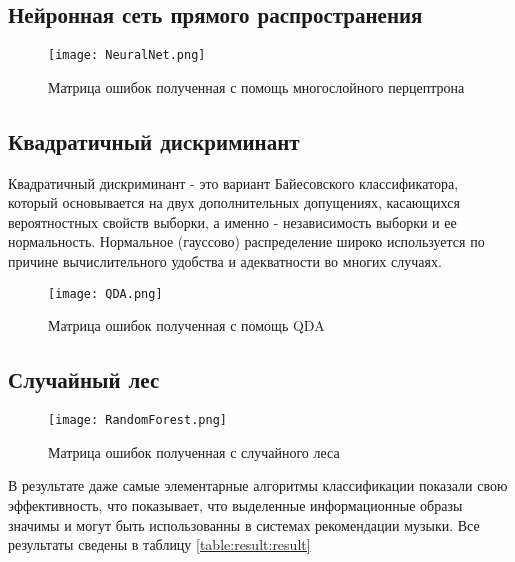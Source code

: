 \subsection{Нейронная сеть прямого распространения}

\begin{figure}[h]
\centering
  \texttt{[image: NeuralNet.png]}
  \caption{Матрица ошибок полученная с помощь многослойного перцептрона}
  \label{fig:results:NeuralNet}
\end{figure}


\subsection{Квадратичный дискриминант}


Квадратичный дискриминант - это вариант Байесовского классификатора, который основывается на двух дополнительных допущениях, касающихся вероятностных свойств выборки, а именно - независимость выборки и ее нормальность. Нормальное (гауссово) распределение широко используется по причине вычислительного удобства и адекватности во многих случаях. 

\begin{figure}[h]
\centering
  \texttt{[image: QDA.png]}
  \caption{Матрица ошибок полученная с помощь QDA}
  \label{fig:results:QDA}
\end{figure}


\subsection{Случайный лес}

\begin{figure}[h]
\centering
  \texttt{[image: RandomForest.png]}
  \caption{Матрица ошибок полученная с случайного леса}
  \label{fig:results:RandomForest}
\end{figure}



В результате даже самые элементарные алгоритмы классификации показали свою эффективность, что показывает, что выделенные информационные образы значимы и могут быть использованны в системах рекомендации музыки. Все результаты сведены в таблицу
\ref{table:result:result}

